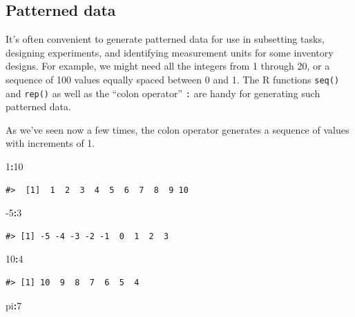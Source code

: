 \documentclass[
  11pt,
]{krantz}
\newenvironment{Shaded}{\begin{snugshade}}{\end{snugshade}}
\newcommand{\DecValTok}[1]{\textcolor[rgb]{0.00,0.00,0.81}{#1}}
\newcommand{\NormalTok}[1]{#1}
\newcommand{\OperatorTok}[1]{\textcolor[rgb]{0.81,0.36,0.00}{\textbf{#1}}}
\theoremstyle{definition}
\theoremstyle{definition}
\theoremstyle{definition}
\theoremstyle{definition}
\theoremstyle{remark}
\begin{document}
\hypertarget{patterned-data}{%
\subsection{Patterned data}\label{patterned-data}}

It's often convenient to generate patterned data for use in subsetting tasks, designing experiments, and identifying measurement units for some inventory designs. For example, we might need all the integers from 1 through 20, or a sequence of 100 values equally spaced between 0 and 1. The R functions \texttt{seq()} and \texttt{rep()} as well as the ``colon operator'' \texttt{:} are handy for generating such patterned data.

As we've seen now a few times, the colon operator generates a sequence of values with increments of 1.

\begin{Shaded}
\begin{Highlighting}[]
\DecValTok{1}\OperatorTok{:}\DecValTok{10}
\end{Highlighting}
\end{Shaded}

\begin{verbatim}
#>  [1]  1  2  3  4  5  6  7  8  9 10
\end{verbatim}

\begin{Shaded}
\begin{Highlighting}[]
\DecValTok{{-}5}\OperatorTok{:}\DecValTok{3}
\end{Highlighting}
\end{Shaded}

\begin{verbatim}
#> [1] -5 -4 -3 -2 -1  0  1  2  3
\end{verbatim}

\begin{Shaded}
\begin{Highlighting}[]
\DecValTok{10}\OperatorTok{:}\DecValTok{4}
\end{Highlighting}
\end{Shaded}

\begin{verbatim}
#> [1] 10  9  8  7  6  5  4
\end{verbatim}

\begin{Shaded}
\begin{Highlighting}[]
\NormalTok{pi}\OperatorTok{:}\DecValTok{7}
\end{Highlighting}
\end{Shaded}
\end{document}
